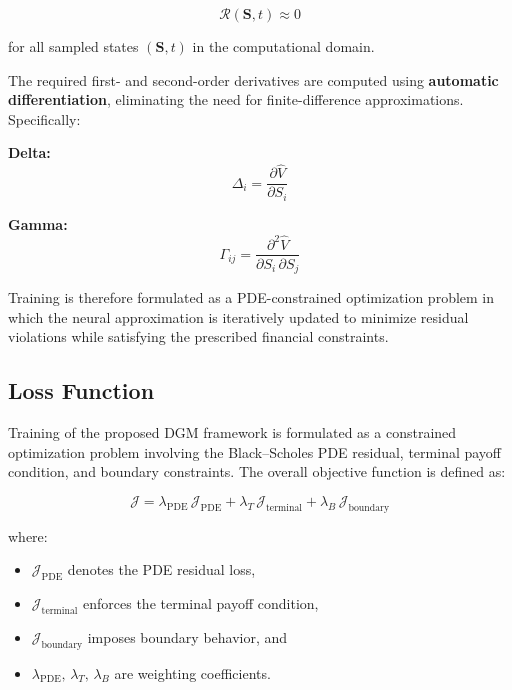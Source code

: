\documentclass[12pt, a4paper]{article}
\begin{document}
\[
    \mathcal{R}(\mathbf{S},t) \approx 0
\]

for all sampled states $(\mathbf{S},t)$ in the computational domain.

The required first- and second-order derivatives are computed using
\textbf{automatic differentiation}, eliminating the need for
finite-difference approximations. Specifically:

\medskip
\noindent\textbf{Delta:}
\begin{equation}
    \Delta_i = \frac{\partial\hat{V}}{\partial S_i}
    \label{eq:delta}
\end{equation}

\noindent\textbf{Gamma:}
\begin{equation}
    \Gamma_{ij} = \frac{\partial^2\hat{V}}{\partial S_i\,\partial S_j}
    \label{eq:gamma}
\end{equation}

Training is therefore formulated as a PDE-constrained optimization
problem in which the neural approximation is iteratively updated to
minimize residual violations while satisfying the prescribed financial
constraints.

\subsection{Loss Function}

Training of the proposed DGM framework is formulated as a constrained
optimization problem involving the Black--Scholes PDE residual, terminal
payoff condition, and boundary constraints. The overall objective
function is defined as:

\begin{equation}
    \mathcal{J} = \lambda_{\mathrm{PDE}}\,\mathcal{J}_{\mathrm{PDE}}
                + \lambda_T\,\mathcal{J}_{\mathrm{terminal}}
                + \lambda_B\,\mathcal{J}_{\mathrm{boundary}}
    \label{eq:loss_total}
\end{equation}

where:
\begin{itemize}
    \item $\mathcal{J}_{\mathrm{PDE}}$ denotes the PDE residual loss,
    \item $\mathcal{J}_{\mathrm{terminal}}$ enforces the terminal payoff
          condition,
    \item $\mathcal{J}_{\mathrm{boundary}}$ imposes boundary behavior,
          and
    \item $\lambda_{\mathrm{PDE}},\,\lambda_T,\,\lambda_B$ are
          weighting coefficients.
\end{itemize}
\end{document}
